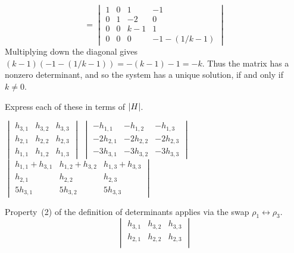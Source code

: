 \begin{exercises}
\begin{answer}
\begin{equation*}
         =
         \begin{vmatrix}
           1  &0  &1  &-1  \\
           0  &1  &-2 &0   \\
           0  &0  &k-1&1   \\
           0  &0  &0  &-1-(1/k-1)
         \end{vmatrix}
      \end{equation*}
      Multiplying down the diagonal gives $(k-1)(-1-(1/k-1))=-(k-1)-1=-k$.
      Thus the matrix has a nonzero determinant, and so the system
      has a unique solution, if and only if \( k\neq 0 \).  
    \end{answer}
  \recommended \item 
    Express each of these in terms of \( \deter{H} \).
    \begin{exparts}
      \partsitem \( \begin{vmatrix}
            h_{3,1}  &h_{3,2} &h_{3,3} \\
            h_{2,1}  &h_{2,2} &h_{2,3} \\
            h_{1,1}  &h_{1,2} &h_{1,3}
          \end{vmatrix} \)
      \partsitem \( \begin{vmatrix}
           -h_{1,1}   &-h_{1,2}  &-h_{1,3} \\
           -2h_{2,1}  &-2h_{2,2} &-2h_{2,3} \\
           -3h_{3,1}  &-3h_{3,2} &-3h_{3,3}
          \end{vmatrix} \)
      \partsitem \( \begin{vmatrix}
            h_{1,1}+h_{3,1}  &h_{1,2}+h_{3,2} &h_{1,3}+h_{3,3} \\
            h_{2,1}          &h_{2,2}         &h_{2,3} \\
            5h_{3,1}         &5h_{3,2}        &5h_{3,3}
          \end{vmatrix} \)
    \end{exparts}
    \begin{answer}
      \begin{exparts}
        \partsitem Property~(2) of the definition of determinants
          applies via the swap $\rho_1\leftrightarrow\rho_3$.
          \begin{equation*}
            \begin{vmatrix}
              h_{3,1}  &h_{3,2} &h_{3,3} \\
              h_{2,1}  &h_{2,2} &h_{2,3} \\

\end{vmatrix}
\end{equation*}
\end{exparts}
\end{answer}
\end{exercises}
